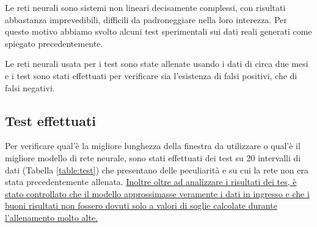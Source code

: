 Le reti neurali sono sistemi non lineari decisamente complessi, con risultati abbastanza imprevedibili, difficili da padroneggiare nella loro interezza. Per questo motivo abbiamo svolto alcuni test sperimentali sui dati reali generati come spiegato precedentemente.

Le reti neurali usata per i test sono state allenate usando i dati di circa due mesi e i test sono stati effettuati per verificare sia l'esistenza di falsi positivi, che di falsi negativi.

\subsection{Test effettuati}

Per verificare qual'è la migliore lunghezza della finestra da utilizzare o qual'è il migliore modello di rete neurale, sono stati effettuati dei test su 20 intervalli di dati (Tabella \ref{table:test}) che presentano delle peculiarità e su cui la rete non era stata precedentemente allenata. 
\uline{Inoltre oltre ad analizzare i risultati dei tes, è stato controllato che il modello approssimasse veramente i dati in ingresso e che i buoni risultati non fossero dovuti solo a valori di soglie calcolate durante l'allenamento molto alte.}

